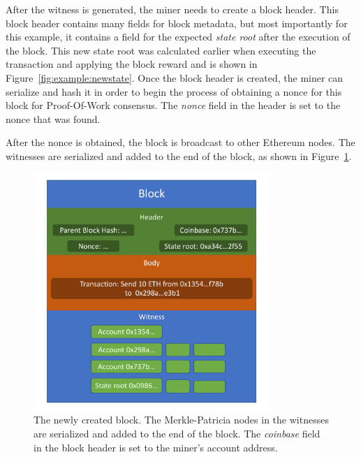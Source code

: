 \documentclass[12pt]{article}
\newcommand{\figurewidth}{0.8\textwidth}
\begin{document}
After the witness is generated, the miner needs to create a block header. This block header contains many fields for block metadata, but most importantly for this example, it contains a field for the expected \emph{state root} after the execution of the block. This new state root was calculated earlier when executing the transaction and applying the block reward and is shown in Figure~\ref{fig:example:newstate}. Once the block header is created, the miner can serialize and hash it in order to begin the process of obtaining a nonce for this block for Proof-Of-Work consensus. The \emph{nonce} field in the header is set to the nonce that was found.

After the nonce is obtained, the block is broadcast to other Ethereum nodes. The witnesses are serialized and added to the end of the block, as shown in Figure~\ref{fig:example:block}.

\begin{figure}[H]
  \centering
  \includegraphics[width=\figurewidth]{../figures/design/example_block.pdf}
  \caption{The newly created block. The Merkle-Patricia nodes in the witnesses are serialized and added to the end of the block. The \emph{coinbase} field in the block header is set to the miner's account address.}
  \label{fig:example:block}
\end{figure}
\end{document}
